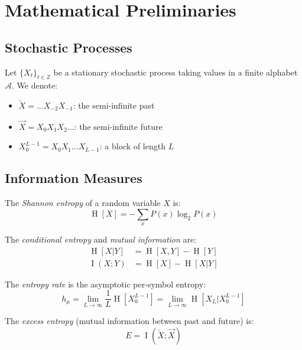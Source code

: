 \documentclass[11pt,twocolumn]{article}
\theoremstyle{plain}
\theoremstyle{definition}
\theoremstyle{remark}
\newcommand{\hmu}{h_\mu}
\newcommand{\calA}{\mathcal{A}}
\newcommand{\Past}{\overleftarrow{X}}
\newcommand{\Future}{\overrightarrow{X}}
\DeclareMathOperator{\Ent}{H}
\DeclareMathOperator{\MI}{I}
\begin{document}
\section{Mathematical Preliminaries}
\label{sec:preliminaries}

\subsection{Stochastic Processes}

Let $\{X_t\}_{t \in \mathbb{Z}}$ be a stationary stochastic process taking values in a finite alphabet $\calA$. We denote:
\begin{itemize}[nosep]
    \item $\Past = \dots X_{-2} X_{-1}$: the semi-infinite past
    \item $\Future = X_0 X_1 X_2 \dots$: the semi-infinite future
    \item $X_0^{L-1} = X_0 X_1 \dots X_{L-1}$: a block of length $L$
\end{itemize}

\subsection{Information Measures}

The \emph{Shannon entropy} of a random variable $X$ is:
\begin{equation}
    \Ent[X] = -\sum_{x} P(x) \log_2 P(x)
\end{equation}

The \emph{conditional entropy} and \emph{mutual information} are:
\begin{align}
    \Ent[X|Y] &= \Ent[X,Y] - \Ent[Y] \\
    \MI(X;Y) &= \Ent[X] - \Ent[X|Y]
\end{align}

The \emph{entropy rate} is the asymptotic per-symbol entropy:
\begin{equation}
    \hmu = \lim_{L \to \infty} \frac{1}{L} \Ent[X_0^{L-1}] = \lim_{L \to \infty} \Ent[X_L | X_0^{L-1}]
\end{equation}

The \emph{excess entropy} (mutual information between past and future) is:
\begin{equation}
    E = \MI(\Past; \Future)
\end{equation}
\end{document}
